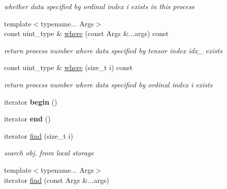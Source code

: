 \begin{DoxyCompactItemize}
\begin{DoxyCompactList}\small\item\em whether data specified by ordinal index i exists in this process \item\end{DoxyCompactList}\item 
\hypertarget{classbtas_1_1_sp_tensor_a1688372fbdc0bad75f35e2c64a84e150}{
{\footnotesize template$<$typename... Args$>$ }\\const uint\_\-type \& \hyperlink{classbtas_1_1_sp_tensor_a1688372fbdc0bad75f35e2c64a84e150}{where} (const Args \&...args) const }
\label{classbtas_1_1_sp_tensor_a1688372fbdc0bad75f35e2c64a84e150}

\begin{DoxyCompactList}\small\item\em return process number where data specified by tensor index idx\_\- exists \item\end{DoxyCompactList}\item 
\hypertarget{classbtas_1_1_sp_tensor_ad35ad10bf56e21fc546e2752d24c4a69}{
const uint\_\-type \& \hyperlink{classbtas_1_1_sp_tensor_ad35ad10bf56e21fc546e2752d24c4a69}{where} (size\_\-t i) const }
\label{classbtas_1_1_sp_tensor_ad35ad10bf56e21fc546e2752d24c4a69}

\begin{DoxyCompactList}\small\item\em return process number where data specified by ordinal index i exists \item\end{DoxyCompactList}\item 
\hypertarget{classbtas_1_1_sp_tensor_ac6636ec547e7e2318896b238c4e81131}{
iterator {\bfseries begin} ()}
\label{classbtas_1_1_sp_tensor_ac6636ec547e7e2318896b238c4e81131}

\item 
\hypertarget{classbtas_1_1_sp_tensor_abdf9eff6f7cc41f2e0af77f09dce1a49}{
iterator {\bfseries end} ()}
\label{classbtas_1_1_sp_tensor_abdf9eff6f7cc41f2e0af77f09dce1a49}

\item 
\hypertarget{classbtas_1_1_sp_tensor_a1ab7ce3b03fcac8910bd18f0ce337118}{
iterator \hyperlink{classbtas_1_1_sp_tensor_a1ab7ce3b03fcac8910bd18f0ce337118}{find} (size\_\-t i)}
\label{classbtas_1_1_sp_tensor_a1ab7ce3b03fcac8910bd18f0ce337118}

\begin{DoxyCompactList}\small\item\em search obj. from local storage \item\end{DoxyCompactList}\item 
\hypertarget{classbtas_1_1_sp_tensor_a9d1fe519c0689659c7baf6e835519a1b}{
{\footnotesize template$<$typename... Args$>$ }\\iterator \hyperlink{classbtas_1_1_sp_tensor_a9d1fe519c0689659c7baf6e835519a1b}{find} (const Args \&...args)}
\label{classbtas_1_1_sp_tensor_a9d1fe519c0689659c7baf6e835519a1b}


\end{DoxyCompactItemize}
